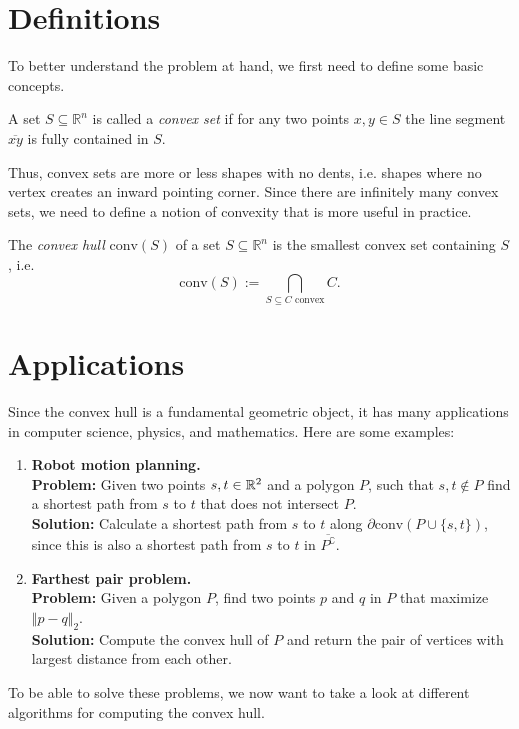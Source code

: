 \section{Definitions}
    To better understand the problem at hand, we first need to define some basic concepts.

    \begin{definition} 
        A set $S \subseteq \mathbb{R}^n$ is called a \emph{convex set} if for any two points $x, y \in S$ the line segment $\overline{xy}$ is fully contained in $S$. 
    \end{definition}

    Thus, convex sets are more or less shapes with no dents, i.e. shapes where no vertex creates an inward pointing corner. Since there are infinitely many convex sets, we need to define a notion of convexity that is more useful in practice.

    \begin{definition}
        The \emph{convex hull} $\mathrm{conv}(S)$ of a set $S \subseteq \mathbb{R}^n$ is the smallest convex set containing $S$, i.e.
        $$\mathrm{conv}(S) := \bigcap_{S \subseteq C \text{ convex}} C .$$
    \end{definition}

\section{Applications}
    Since the convex hull is a fundamental geometric object, it has many applications in computer science, physics, and mathematics. Here are some examples:
    \begin{enumerate}
        \item \textbf{Robot motion planning.} \\ 
        \textbf{Problem:} Given two points $s, t \in \mathbb{R}^2$ and a polygon $P$, such that $s, t \notin P$ find a shortest path from $s$ to $t$ that does not intersect $P$. \\
        \textbf{Solution:} Calculate a shortest path from $s$ to $t$ along $\partial\mathrm{conv}(P \cup \{s, t\})$, since this is also a shortest path from $s$ to $t$ in $\overline{P^\complement}$. 

        \item \textbf{Farthest pair problem.} \\
        \textbf{Problem:} Given a polygon $P$, find two points $p$ and $q$ in $P$ that maximize $\Vert p - q \Vert_2$. \\
        \textbf{Solution:} Compute the convex hull of $P$ and return the pair of vertices with largest distance from each other. 
    \end{enumerate} 
    To be able to solve these problems, we now want to take a look at different algorithms for computing the convex hull.

